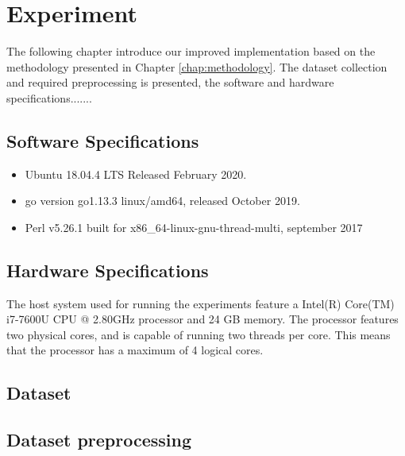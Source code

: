 \chapter{Experiment}
\label{chap:experiment}
The following chapter introduce our improved implementation based on the methodology presented in Chapter \ref{chap:methodology}. The dataset collection and required preprocessing is presented, the software and hardware specifications.......

\iffalse
The following chapter introduces the actual implementation of the experiment based on the methodology presented in Chapter 4. The collection of the data set, the software versions, the hardware
specifications and the used algorithms during the experiment are presented as well as the experimental design and the technical implementation. It demonstrates the technical execution of the
methodology for reproducibility of the use case.
\fi

\section{Software Specifications}
\label{sec:softwarespecs}

\begin{itemize}
    \item Ubuntu 18.04.4 LTS Released February 2020.
    \item go version go1.13.3 linux/amd64, released October 2019.
    \item Perl v5.26.1 built for x86\_64-linux-gnu-thread-multi, september 2017 
\end{itemize}

\section{Hardware Specifications}
\label{sec:hardwarespecs}
The host system used for running the experiments feature a Intel(R) Core(TM) i7-7600U CPU @ 2.80GHz processor and 24 GB memory. The processor features two physical cores, and is capable of running two threads per core. This means that the processor has a maximum of 4 logical cores.

\section{Dataset}

\section{Dataset preprocessing}
\label{sec:datasetprocessing}

